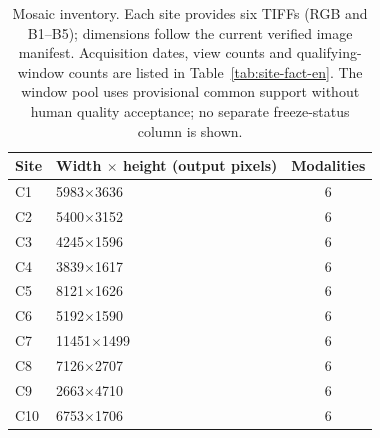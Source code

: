 \begin{table}[htbp]\centering\small
\caption{Mosaic inventory. Each site provides six TIFFs (RGB and B1--B5); dimensions follow the current verified image manifest. Acquisition dates, view counts and qualifying-window counts are listed in Table~\ref{tab:site-fact-en}. The window pool uses provisional common support without human quality acceptance; no separate freeze-status column is shown.}
\label{tab:scene-inventory}
\begin{tabular}{llc}\toprule
Site & Width $\times$ height (output pixels) & Modalities\\\midrule
C1 & 5983$\times$3636 & 6\\
C2 & 5400$\times$3152 & 6\\
C3 & 4245$\times$1596 & 6\\
C4 & 3839$\times$1617 & 6\\
C5 & 8121$\times$1626 & 6\\
C6 & 5192$\times$1590 & 6\\
C7 & 11451$\times$1499 & 6\\
C8 & 7126$\times$2707 & 6\\
C9 & 2663$\times$4710 & 6\\
C10 & 6753$\times$1706 & 6\\
\bottomrule\end{tabular}\end{table}
